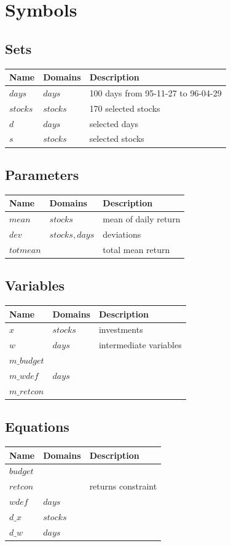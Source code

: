 \documentclass[11pt]{article}
\begin{document}
\section*{Symbols}


\subsection*{Sets}
\begin{tabularx}{\textwidth}{| l | l | X |}
\hline
\textbf{Name} & \textbf{Domains} & \textbf{Description}\\
\hline
\endhead

$days$ & $days$ & 100 days from 95-11-27 to 96-04-29\\
$stocks$ & $stocks$ & 170 selected stocks\\
$d$ & $days$ & selected days\\
$s$ & $stocks$ & selected stocks\\
\hline
\end{tabularx}
\subsection*{Parameters}
\begin{tabularx}{\textwidth}{| l | l | X |}
\hline
\textbf{Name} & \textbf{Domains} & \textbf{Description}\\
\hline
\endhead

$mean$ & $stocks$ & mean of daily return\\
$dev$ & $stocks,days$ & deviations\\
$totmean$ &  & total mean return\\
\hline
\end{tabularx}
\subsection*{Variables}
\begin{tabularx}{\textwidth}{| l | l | X |}
\hline
\textbf{Name} & \textbf{Domains} & \textbf{Description}\\
\hline
\endhead

$x$ & $stocks$ & investments\\
$w$ & $days$ & intermediate variables\\
$m\_budget$ &  & \\
$m\_wdef$ & $days$ & \\
$m\_retcon$ &  & \\
\hline
\end{tabularx}
\subsection*{Equations}
\begin{tabularx}{\textwidth}{| l | l | X |}
\hline
\textbf{Name} & \textbf{Domains} & \textbf{Description}\\
\hline
\endhead

$budget$ &  & \\
$retcon$ &  & returns constraint\\
$wdef$ & $days$ & \\
$d\_x$ & $stocks$ & \\
$d\_w$ & $days$ & \\
\hline
\end{tabularx}
\end{document}
